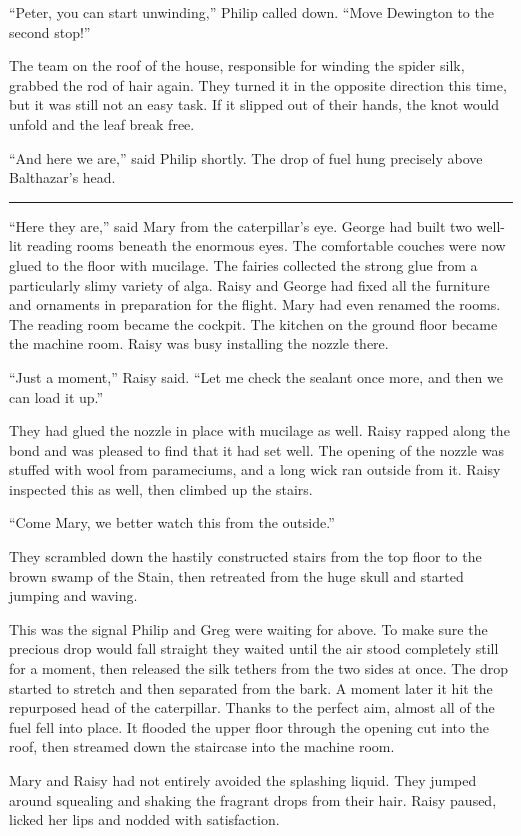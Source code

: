 \documentclass[10pt]{memoir}
\renewcommand{\pfbreakdisplay}{\bigskip \ding{166} \bigskip}
\newcommand{\secbreak}{\fancybreak{\pfbreakdisplay}}
\begin{document}
``Peter, you can start unwinding,'' Philip called down. ``Move Dewington to the
second stop!''

The team on the roof of the house, responsible for winding the spider silk,
grabbed the rod of hair again. They turned it in the opposite direction this
time, but it was still not an easy task. If it slipped out of their hands, the
knot would unfold and the leaf break free.

``And here we are,'' said Philip shortly. The drop of fuel hung precisely above
Balthazar's head.

\secbreak

``Here they are,'' said Mary from the caterpillar's eye. George had built two
well-lit reading rooms beneath the enormous eyes. The comfortable couches were
now glued to the floor with mucilage. The fairies collected the strong glue
from a particularly slimy variety of alga. Raisy and George had fixed all the
furniture and ornaments in preparation for the flight. Mary had even renamed
the rooms. The reading room became the cockpit. The kitchen on the ground floor
became the machine room. Raisy was busy installing the nozzle there.

``Just a moment,'' Raisy said. ``Let me check the sealant once more, and then
we can load it up.''

They had glued the nozzle in place with mucilage as well. Raisy rapped along
the bond and was pleased to find that it had set well. The opening of the
nozzle was stuffed with wool from parameciums, and a long wick ran outside from
it. Raisy inspected this as well, then climbed up the stairs.

``Come Mary, we better watch this from the outside.''

They scrambled down the hastily constructed stairs from the top floor to the
brown swamp of the Stain, then retreated from the huge skull and started
jumping and waving.

This was the signal Philip and Greg were waiting for above. To make sure the
precious drop would fall straight they waited until the air stood completely
still for a moment, then released the silk tethers from the two sides at once.
The drop started to stretch and then separated from the bark. A moment later it
hit the repurposed head of the caterpillar. Thanks to the perfect aim, almost
all of the fuel fell into place. It flooded the upper floor through the opening
cut into the roof, then streamed down the staircase into the machine room.

Mary and Raisy had not entirely avoided the splashing liquid. They jumped
around squealing and shaking the fragrant drops from their hair. Raisy paused,
licked her lips and nodded with satisfaction.
\end{document}
